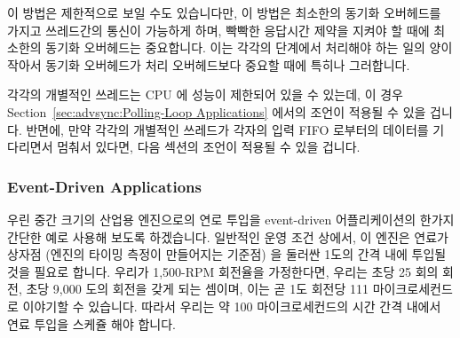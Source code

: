 이 방법은 제한적으로 보일 수도 있습니다만, 이 방법은 최소한의 동기화 오버헤드를
가지고 쓰레드간의 통신이 가능하게 하며, 빡빡한 응답시간 제약을 지켜야 할 때에
최소한의 동기화 오버헤드는 중요합니다.
이는 각각의 단계에서 처리해야 하는 일의 양이 작아서 동기화 오버헤드가 처리
오버헤드보다 중요할 때에 특히나 그러합니다.

각각의 개별적인 쓰레드는 CPU 에 성능이 제한되어 있을 수 있는데, 이 경우
Section~\ref{sec:advsync:Polling-Loop Applications}
에서의 조언이 적용될 수 있을 겁니다.
반면에, 만약 각각의 개별적인 쓰레드가 각자의 입력 FIFO 로부터의 데이터를
기다리면서 멈춰서 있다면, 다음 섹션의 조언이 적용될 수 있을 겁니다.

\subsubsection{Event-Driven Applications}
\label{sec:advsync:Event-Driven Applications}

우린 중간 크기의 산업용 엔진으로의 연로 투입을 event-driven 어플리케이션의
한가지 간단한 예로 사용해 보도록 하겠습니다.
일반적인 운영 조건 상에서, 이 엔진은 연료가 상자점 (엔진의 타이밍 측정이
만들어지는 기준점) 을 둘러싼 1도의 간격 내에 투입될 것을 필요로 합니다.
우리가 1,500-RPM 회전율을 가정한다면, 우리는 초당 25 회의 회전, 초당 9,000 도의
회전을 갖게 되는 셈이며, 이는 곧 1도 회전당 111 마이크로세컨드로 이야기할 수
있습니다.
따라서 우리는 약 100 마이크로세컨드의 시간 간격 내에서 연료 투입을 스케쥴 해야
합니다.


